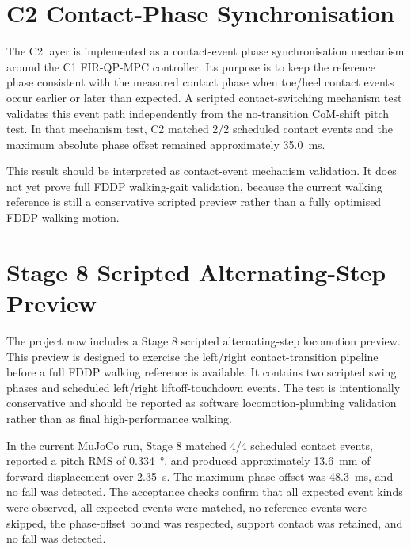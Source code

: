 \section{C2 Contact-Phase Synchronisation}
\label{sec:c2_contact_phase_synchronisation_20260708}

The C2 layer is implemented as a contact-event phase synchronisation mechanism
around the C1 FIR-QP-MPC controller. Its purpose is to keep the reference phase
consistent with the measured contact phase when toe/heel contact events occur
earlier or later than expected. A scripted contact-switching mechanism test
validates this event path independently from the no-transition CoM-shift pitch
test. In that mechanism test, C2 matched 2/2 scheduled contact events and the
maximum absolute phase offset remained approximately
\SI{35.0}{\milli\second}.

This result should be interpreted as contact-event mechanism validation. It
does not yet prove full FDDP walking-gait validation, because the current
walking reference is still a conservative scripted preview rather than a fully
optimised FDDP walking motion.

\section{Stage 8 Scripted Alternating-Step Preview}
\label{sec:stage8_scripted_alternating_step_20260708}

The project now includes a Stage 8 scripted alternating-step locomotion
preview. This preview is designed to exercise the left/right contact-transition
pipeline before a full FDDP walking reference is available. It contains two
scripted swing phases and scheduled left/right liftoff-touchdown events. The
test is intentionally conservative and should be reported as software
locomotion-plumbing validation rather than as final high-performance walking.

In the current MuJoCo run, Stage 8 matched 4/4 scheduled contact events,
reported a pitch RMS of \SI{0.334}{\degree}, and produced approximately
\SI{13.6}{\milli\metre} of forward displacement over
\SI{2.35}{\second}. The maximum phase offset was
\SI{48.3}{\milli\second}, and no fall was detected. The acceptance checks
confirm that all expected event kinds were observed, all expected events were
matched, no reference events were skipped, the phase-offset bound was
respected, support contact was retained, and no fall was detected.

